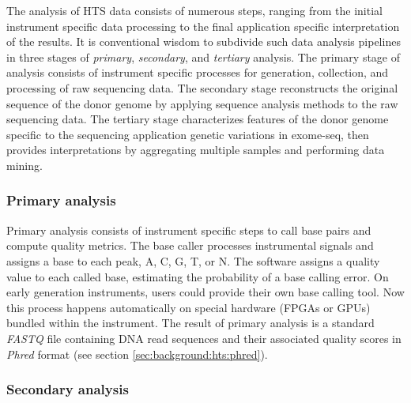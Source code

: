 The analysis of HTS data consists of numerous steps, ranging from the initial instrument specific data processing to the final application specific interpretation of the results.
It is conventional wisdom to subdivide such data analysis pipelines in three stages of \emph{primary}, \emph{secondary}, and \emph{tertiary} analysis.
The primary stage of analysis consists of instrument specific processes for generation, collection, and processing of raw sequencing data.
The secondary stage reconstructs the original sequence of the donor genome by applying sequence analysis methods to the raw sequencing data.
The tertiary stage characterizes features of the donor genome specific to the sequencing application \eg genetic variations in exome-seq, then provides interpretations \eg by aggregating multiple samples and performing data mining.


\subsubsection{Primary analysis}

Primary analysis consists of instrument specific steps to call base pairs and compute quality metrics.
The base caller processes instrumental signals and assigns a base to each peak, \ie A, C, G, T, or N.
The software assigns a quality value to each called base, estimating the probability of a base calling error.
On early generation instruments, users could provide their own base calling tool.
Now this process happens automatically on special hardware (\eg FPGAs or GPUs) bundled within the instrument.
The result of primary analysis is a standard \emph{FASTQ} file containing DNA read sequences and their associated quality scores in \emph{Phred} format (see section \ref{sec:background:hts:phred}).

\subsubsection{Secondary analysis}

